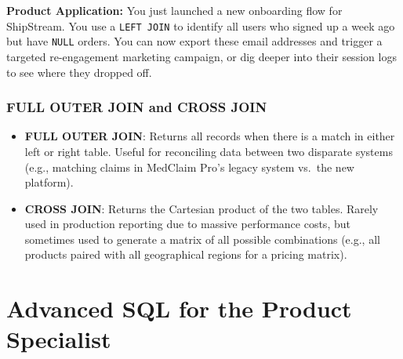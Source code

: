 \begin{Shaded}
\begin{Highlighting}[]
 \OperatorTok{=}
  
  \OperatorTok{\textless{}}  \OperatorTok{{-}}  \NormalTok{;}
\end{Highlighting}
\end{Shaded}

\textbf{Product Application:} You just launched a new onboarding flow
for ShipStream. You use a \texttt{LEFT\ JOIN} to identify all users who
signed up a week ago but have \texttt{NULL} orders. You can now export
these email addresses and trigger a targeted re-engagement marketing
campaign, or dig deeper into their session logs to see where they
dropped off.

\subsubsection{FULL OUTER JOIN and CROSS
JOIN}\label{full-outer-join-and-cross-join}

\begin{itemize}
\tightlist
\item
  \textbf{FULL OUTER JOIN}: Returns all records when there is a match in
  either left or right table. Useful for reconciling data between two
  disparate systems (e.g., matching claims in MedClaim Pro's legacy
  system vs.~the new platform).
\item
  \textbf{CROSS JOIN}: Returns the Cartesian product of the two tables.
  Rarely used in production reporting due to massive performance costs,
  but sometimes used to generate a matrix of all possible combinations
  (e.g., all products paired with all geographical regions for a pricing
  matrix).
\end{itemize}

\bigskip

\section{Advanced SQL for the Product
Specialist}\label{advanced-sql-for-the-product-specialist}

